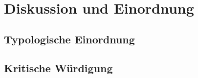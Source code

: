 \section{Diskussion und Einordnung}

\subsection{Typologische Einordnung}

\subsection{Kritische Würdigung}
